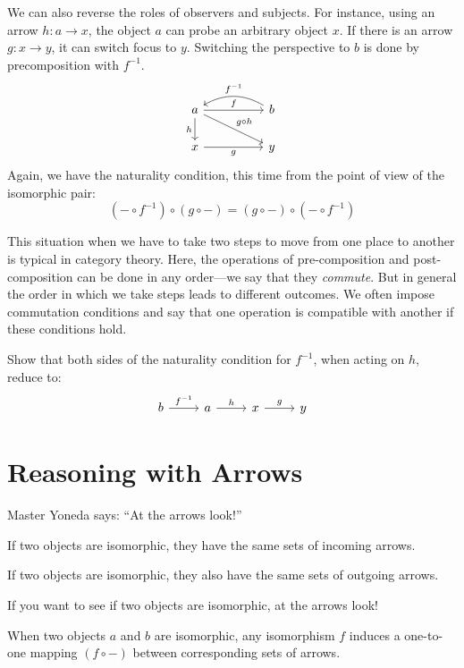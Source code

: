 \documentclass[DaoFP]{subfiles}
\begin{document}
We can also reverse the roles of observers and subjects. For instance, using an arrow $h \colon a \to x$, the object $a$ can probe an arbitrary object $x$. If there is an arrow $g \colon x \to y$, it can switch focus to $y$. Switching the perspective to $b$ is done by precomposition with $f^{-1}$.
\[
 \begin{tikzcd}
 a
 \arrow[rr, "f"]
 \arrow[d, "h"']
 \arrow[rrd, "g\circ h"]
 && b
  \arrow[ll, bend right,  "f^{-1}"']
 \\
 x
 \arrow[rr, "g"']
  && y
 \end{tikzcd}
\]
Again, we have the naturality condition, this time from the point of view of the isomorphic pair:
\[(- \circ f^{-1}) \circ (g \circ -) = (g \circ -) \circ (- \circ f^{-1}) \]

This situation when we have to take two steps to move from one place to another is typical in category theory. Here, the operations of pre-composition and post-composition can be done in any order---we say that they \emph{commute}. But in general the order in which we take steps leads to different outcomes. We often impose commutation conditions and say that one operation is compatible with another if these conditions hold.

\begin{exercise}
Show that both sides of the naturality condition for $f^{-1}$, when acting on $h$, reduce to:
\[
 \begin{tikzcd}
 b \arrow[r, "f^{-1}"] &a \arrow[r, "h"] & x \arrow[r, "g"] & y
\end{tikzcd}
\]

\end{exercise}

\section{Reasoning with Arrows}

Master Yoneda says: ``At the arrows look!''

If two objects are isomorphic, they have the same sets of incoming arrows. 

If two objects are isomorphic, they also have the same sets of outgoing arrows.

If you want to see if two objects are isomorphic, at the arrows look!

\medskip

When two objects $a$ and $b$ are isomorphic, any isomorphism $f$ induces a one-to-one mapping $(f \circ -)$ between corresponding sets of arrows.  
\end{document}
